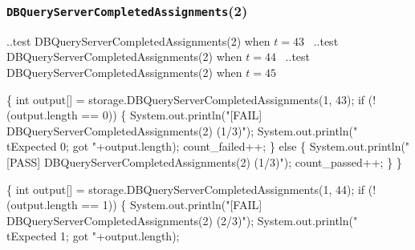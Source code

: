 \documentclass{article}
\def\nwendcode{\endtrivlist \endgroup}
\let\nwdocspar=\par
\begin{document}
\subsubsection{{\tt{}DBQueryServerCompletedAssignments}(2)}
\nwenddocs{}\endmoddef{}
  \LA{}..test \code{}DBQueryServerCompletedAssignments\edoc{}(2) when $t=43$~{\nwtagstyle{}}\RA{}
  \LA{}..test \code{}DBQueryServerCompletedAssignments\edoc{}(2) when $t=44$~{\nwtagstyle{}}\RA{}
  \LA{}..test \code{}DBQueryServerCompletedAssignments\edoc{}(2) when $t=45$~{\nwtagstyle{}}\RA{}
\nwendcode{}\nwdocspar
\nwenddocs{}\endmoddef{}
\{
  int output[] = storage.DBQueryServerCompletedAssignments(1, 43);
  if (!(output.length == 0)) \{
    System.out.println("[FAIL] DBQueryServerCompletedAssignments(2) (1/3)");
    System.out.println("\\tExpected 0; got "+output.length);
    count_failed++;
  \} else \{
    System.out.println("[PASS] DBQueryServerCompletedAssignments(2) (1/3)");
    count_passed++;
  \}
\}
\nwendcode{}\nwdocspar
\nwenddocs{}\endmoddef{}
\{
  int output[] = storage.DBQueryServerCompletedAssignments(1, 44);
  if (!(output.length == 1)) \{
    System.out.println("[FAIL] DBQueryServerCompletedAssignments(2) (2/3)");
    System.out.println("\\tExpected 1; got "+output.length);
\end{document}
